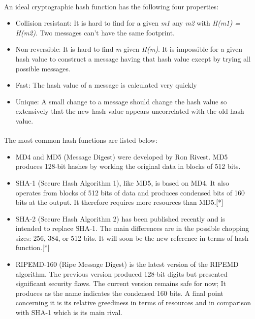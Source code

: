 \paragraph{}
{\setlength{\parindent}{0cm}
An ideal cryptographic hash function has the following four properties:
}

\begin{itemize}
  \setlength\itemsep{0em}

  \item Collision resistant: It is hard to find for a given \emph{m1} any \emph{m2} with \emph{H(m1) = H(m2)}. Two messages can't have the same footprint.
  \item Non-reversible: It is hard to find \emph{m} given \emph{H(m)}. It is impossible for a given hash value to construct a message having that hash value except by trying all possible messages.
  \item Fast: The hash value of a message is calculated very quickly
  \item Unique: A small change to a message should change the hash value so extensively that the new hash value appears uncorrelated with the old hash value.

\end{itemize}

\paragraph{}
The most common hash functions are listed below:
\begin{itemize}
  \setlength\itemsep{0em}

  \item MD4 and MD5 (Message Digest) were developed by Ron Rivest. MD5 produces 128-bit hashes by working the original data in blocks of 512 bits.
  \item SHA-1 (Secure Hash Algorithm 1), like MD5, is based on MD4. It also operates from blocks of 512 bits of data and produces condensed bits of 160 bits at the output. It therefore requires more resources than MD5.[*]
   \item SHA-2 (Secure Hash Algorithm 2) has been published recently and is intended to replace SHA-1. The main differences are in the possible chopping sizes: 256, 384, or 512 bits. It will soon be the new reference in terms of hash function.[*]
  \item RIPEMD-160 (Ripe Message Digest) is the latest version of the RIPEMD algorithm. The previous version produced 128-bit digits but presented significant security flaws. The current version remains safe for now; It produces as the name indicates the condensed 160 bits. A final point concerning it is its relative greediness in terms of resources and in comparison with SHA-1 which is its main rival.
\end{itemize}

